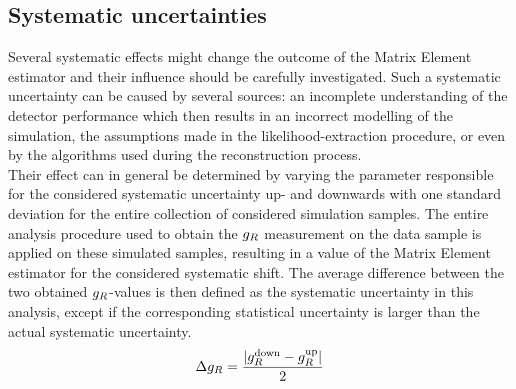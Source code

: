 \subsection{Systematic uncertainties}

Several systematic effects might change the outcome of the Matrix Element estimator and their influence should be carefully investigated.
Such a systematic uncertainty can be caused by several sources: an incomplete understanding of the detector performance which then results in an incorrect modelling of the simulation, the assumptions made in the likelihood-extraction procedure, or even by the algorithms used during the reconstruction process.
\\
Their effect can in general be determined by varying the parameter responsible for the considered systematic uncertainty up- and downwards with one standard deviation for the entire collection of considered simulation samples.
The entire analysis procedure used to obtain the $g_{R}$ measurement on the data sample is applied on these simulated samples, resulting in a value of the Matrix Element estimator for the considered systematic shift.
The average difference between the two obtained $g_{R}$-values is then defined as the systematic uncertainty in this analysis, except if the corresponding statistical uncertainty is larger than the actual systematic uncertainty.
\begin{equation} \label{eq::Syst}
 \Delta \gR =  \frac{\vert \gR^{\textrm{down}} - \gR^{\textrm{up}} \vert}{2} %
\end{equation}

